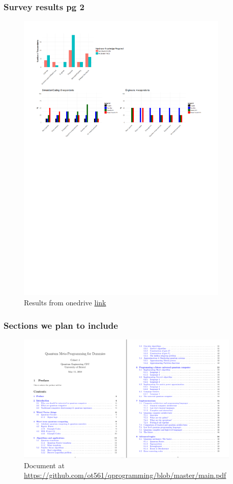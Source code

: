 \documentclass{beamer}
\begin{document}
\begin{frame}
\frametitle{Survey results pg 2}
\begin{figure}[H]
	\centering
	\includegraphics[width=0.9\textwidth]{pg_0002.pdf}
	\caption{Results from onedrive \url{link}}
	\label{}
\end{figure}
\end{frame}

\begin{frame}
\frametitle{Sections we plan to include}
\begin{figure}[H]
	\centering
	\includegraphics[width=0.95\textwidth]{cohortprojcontents.png}
	\caption{Document at \url{https://github.com/ot561/qprogramming/blob/master/main.pdf}}
	\label{}
\end{figure}
\end{frame}
\end{document}
